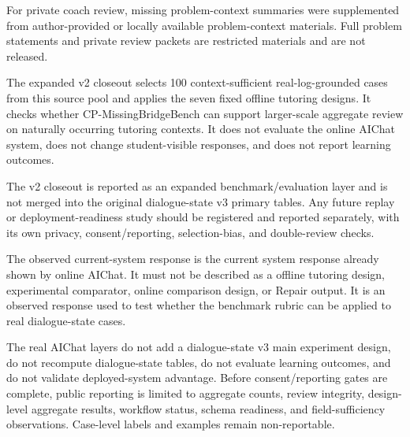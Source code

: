 \documentclass[11pt]{article}
\begin{document}
For private coach review, missing problem-context summaries were supplemented from author-provided or locally available problem-context materials. Full problem statements and private review packets are restricted materials and are not released.

The expanded v2 closeout selects 100 context-sufficient real-log-grounded cases from this source pool and applies the seven fixed offline tutoring designs. It checks whether CP-MissingBridgeBench can support larger-scale aggregate review on naturally occurring tutoring contexts. It does not evaluate the online AIChat system, does not change student-visible responses, and does not report learning outcomes.

The v2 closeout is reported as an expanded benchmark/evaluation layer and is not merged into the original dialogue-state v3 primary tables. Any future replay or deployment-readiness study should be registered and reported separately, with its own privacy, consent/reporting, selection-bias, and double-review checks.

The observed current-system response is the current system response already shown by online AIChat. It must not be described as a offline tutoring design, experimental comparator, online comparison design, or Repair output. It is an observed response used to test whether the benchmark rubric can be applied to real dialogue-state cases.

The real AIChat layers do not add a dialogue-state v3 main experiment design, do not recompute dialogue-state tables, do not evaluate learning outcomes, and do not validate deployed-system advantage. Before consent/reporting gates are complete, public reporting is limited to aggregate counts, review integrity, design-level aggregate results, workflow status, schema readiness, and field-sufficiency observations. Case-level labels and examples remain non-reportable.



\end{document}
